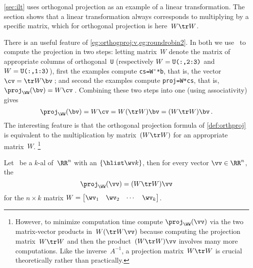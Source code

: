 \begin{aside}
\autoref{sec:ilt} uses orthogonal projection as an example of a linear transformation. 
The section shows that a linear transformation always corresponds to multiplying by a specific matrix, which for orthogonal projection is here~\(W\tr W\).
\end{aside}
There is an useful feature of \cref{eg:orthogproj:v,eg:roundrobin2}.
In both we use \script\ to compute the projection in two steps: 
letting matrix~\(W\) denote the matrix of appropriate columns of orthogonal~\verb|U| (respectively \(W=\verb|U(:,2:3)|\) and \(W=\verb|U(:,1:3)|\)), first the examples compute \verb|cs=W'*b|, that is, the vector \(\cv=\tr W\bv\)\,; and second the examples compute \verb|proj=W*cs|, that is, \(\proj_\WW(\bv)=W\cv\)\,.
Combining these two steps into one (using associativity) gives
\begin{equation*}
\proj_\WW(\bv)=W\cv=W(\tr W)\bv=(W\tr W)\bv\,.
\end{equation*}
The interesting feature is that the orthogonal projection formula of \autoref{def:orthproj} is equivalent to the multiplication by matrix~\((W\tr W)\) for an appropriate matrix~\(W\).%
\footnote{However, to minimize computation time compute \(\proj_\WW(\vv)\) via the two matrix-vector products in~\(W(\tr W\vv)\) because computing the projection matrix~\(W\tr W\) and then the product~\((W\tr W)\vv\) involves many more computations.  Like the inverse~\(A^{-1}\), a projection matrix~\(W\tr W\) is crucial theoretically  rather than practically.}



\begin{theorem} \label{thm:projmat}
Let \WW\ be a \(k\)-al  of~\(\RR^n\) with an  \(\{\hlist\wv k\}\), then for every vector \(\vv\in\RR^n\), the 
\begin{equation}
\proj_\WW(\vv)=(W\tr W)\vv
\end{equation}
for the \(n\times k\) matrix \(W=\begin{bmatrix} \wv_1&\wv_2&\cdots&\wv_k \end{bmatrix}\).
\end{theorem}

